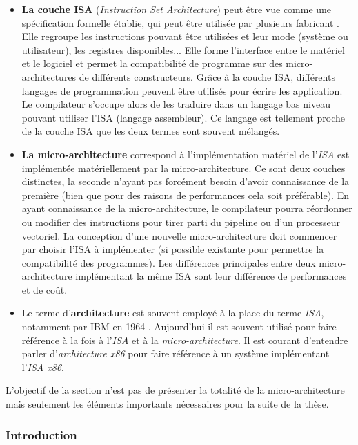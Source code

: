 \begin{itemize}
    \item  \textbf{La couche ISA} (\textit{Instruction Set Architecture})  peut être vue comme une spécification formelle établie, qui peut être utilisée par plusieurs fabricant \cite{tanenbaum2016structured}. Elle regroupe les instructions pouvant être utilisées et leur mode (système ou utilisateur), les registres disponibles... 
    Elle forme l'interface entre le matériel et le logiciel et permet la compatibilité de programme sur des micro-architectures de différents constructeurs.
    Grâce à la couche ISA, différents langages de programmation peuvent être utilisés pour écrire les application. Le compilateur s'occupe alors de les traduire dans un langage bas niveau pouvant utiliser l'ISA (langage assembleur). Ce langage est tellement proche de la couche ISA que les deux termes sont souvent mélangés.

    \item \textbf{La micro-architecture} correspond à l'implémentation matériel de l'\textit{ISA} est implémentée matériellement par la micro-architecture. Ce sont deux couches distinctes, la seconde n'ayant pas forcément besoin d'avoir connaissance de la première (bien que pour des raisons de performances cela soit préférable). En ayant connaissance de la micro-architecture, le compilateur pourra réordonner ou modifier des instructions pour tirer parti du pipeline ou d'un processeur vectoriel. La conception d'une nouvelle micro-architecture doit commencer par choisir l'ISA à implémenter (si possible existante pour permettre la compatibilité des programmes). Les différences principales entre deux micro-architecture implémentant la même ISA sont leur différence de performances et de coût.
    
    \item Le terme d'\textbf{architecture} est souvent employé à la place du terme \textit{ISA}, notamment par IBM en 1964 \cite{amdahl1964architecture}.  Aujourd'hui il est souvent utilisé pour faire référence à la fois à l'\textit{ISA} et à la \textit{micro-architecture}. Il est courant d'entendre parler d'\textit{architecture x86} pour faire référence à un système implémentant l'\textit{ISA x86}.
\end{itemize}


L’objectif de la section n’est pas de présenter la totalité de la micro-architecture mais seulement les éléments importants nécessaires pour la suite de la thèse.

\subsubsection{Introduction}


